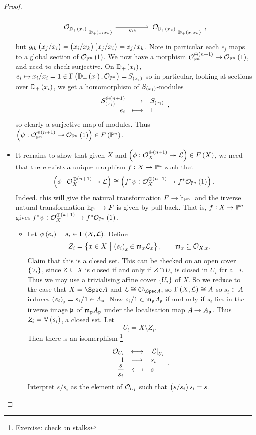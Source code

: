 \begin{proof}
\begin{itemize}
$$\begin{tikzcd}
\eval{\OOO_{\DD_+\br{x_i}}}_{\DD_+\br{x_ix_k}} \arrow{rr}[swap]{\cdot g_{ik}} & & \eval{\OOO_{\DD_+\br{x_k}}}_{\DD_+\br{x_ix_k}}
\end{tikzcd},
$$
but $ g_{ik}\br{x_j / x_i} = \br{x_i / x_k}\br{x_j / x_i} = x_j / x_k $. Note in particular each $ e_j $ maps to a global section of $ \OOO_{\PP^n}\br{1} $. We now have a morphism $ \OOO_{\PP^n}^{\oplus \br{n + 1}} \to \OOO_{\PP^n}\br{1} $, and need to check surjective. On $ \DD_+\br{x_i} $, $ e_i \mapsto x_i / x_i = 1 \in \Gamma\br{\DD_+\br{x_i}, \OOO_{\PP^n}} = S_{\br{x_i}} $ so in particular, looking at sections over $ \DD_+\br{x_i} $, we get a homomorphism of $ S_{\br{x_i}} $-modules
$$ \function{S_{\br{x_i}}^{\oplus \br{n + 1}}}{S_{\br{x_i}}}{e_i}{1}, $$
so clearly a surjective map of modules. Thus $ \br{\psi : \OOO_{\PP^n}^{\oplus \br{n + 1}} \twoheadrightarrow \OOO_{\PP^n}\br{1}} \in F\br{\PP^n} $.

\pagebreak

\item It remains to show that given $ X $ and $ \br{\phi : \OOO_X^{\oplus \br{n + 1}} \twoheadrightarrow \LLL} \in F\br{X} $, we need that there exists a unique morphism $ f : X \to \mathbb{P}^n $ such that
$$ \br{\phi : \OOO_X^{\oplus \br{n + 1}} \twoheadrightarrow \LLL} \cong \br{f^*\psi : \OOO_X^{\oplus \br{n + 1}} \to f^*\OOO_{\PP^n}\br{1}}. $$
Indeed, this will give the natural transformation $ F \to \mathrm{h}_{\mathbb{P}^n} $, and the inverse natural transformation $ \mathrm{h}_{\mathbb{P}^n} \to F $ is given by pull-back. That is, $ f : X \to \mathbb{P}^n $ gives $ f^*\psi : \OOO_X^{\oplus \br{n + 1}} \to f^*\OOO_{\PP^n}\br{1} $.
\begin{itemize}
\item Let $ \phi\br{e_i} = s_i \in \Gamma\br{X, \LLL} $. Define
$$ Z_i = \cbr{x \in X \st \br{s_i}_x \in \mmm_x\LLL_x}, \qquad \mmm_x \subseteq \OOO_{X, x}. $$
Claim that this is a closed set. This can be checked on an open cover $ \cbr{U_i} $, since $ Z \subseteq X $ is closed if and only if $ Z \cap U_i $ is closed in $ U_i $ for all $ i $. Thus we may use a trivialising affine cover $ \cbr{U_i} $ of $ X $. So we reduce to the case that $ X = \Spec A $ and $ \LLL \cong \OOO_{\Spec A} $, so $ \Gamma\br{X, \LLL} \cong A $ so $ s_i \in A $ induces $ \br{s_i}_\ppp = s_i / 1 \in A_\ppp $. Now $ s_i / 1 \in \mathfrak{m}_{\mathfrak{p}} A_{\mathfrak{p}} $ if and only if $ s_i $ lies in the inverse image $ \mathfrak{p} $ of $ \mathfrak{m}_{\mathfrak{p}} A_{\mathfrak{p}} $ under the localisation map $ A \to A_{\mathfrak{p}} $. Thus $ Z_i = \VV\br{s_i} $, a closed set. Let
$$ U_i = X \setminus Z_i. $$
Then there is an isomorphism \footnote{Exercise: check on stalks}
$$ \bijection{\OOO_{U_i}}{\eval{\LLL}_{U_i}}{1}{s_i}{\dfrac{s}{s_i}}{s}. $$
Interpret $ s / s_i $ as the element of $ \mathcal{O}_{U_i} $ such that $ \br{s / s_i}s_i = s $.


\end{itemize}
\end{itemize}
\end{proof}
